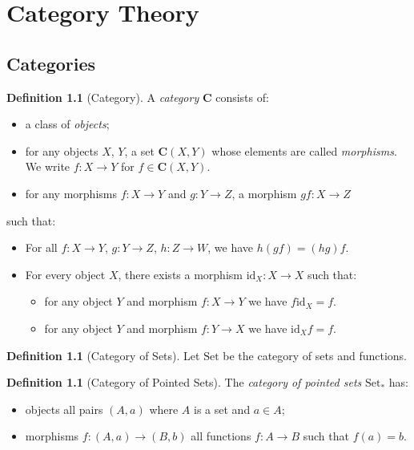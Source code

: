\documentclass{book}
\theoremstyle{definition}
\newtheorem{df}[ax]{Definition}
\newcommand{\id}[1]{\ensuremath{\mathrm{id}_{#1}}}
\begin{document}
\chapter{Category Theory}

\section{Categories}

\begin{df}[Category]
A \emph{category} $\mathbf{C}$ consists of:
\begin{itemize}
\item a class of \emph{objects};
\item for any objects $X$, $Y$, a set $\mathbf{C}(X,Y)$ whose elements are called \emph{morphisms}. We write $f : X \rightarrow Y$ for $f \in \mathbf{C}(X,Y)$.
\item for any morphisms $f : X \rightarrow Y$ and $g : Y \rightarrow Z$, a morphism $gf : X \rightarrow Z$
\end{itemize}
such that:
\begin{itemize}
\item For all $f : X \rightarrow Y$, $g : Y \rightarrow Z$, $h : Z \rightarrow W$, we have $h(gf) = (hg)f$.
\item For every object $X$, there exists a morphism $\id{X} : X \rightarrow X$ such that:
\begin{itemize}
\item for any object $Y$ and morphism $f : X \rightarrow Y$ we have $f \id{X} = f$.
\item for any object $Y$ and morphism $f : Y \rightarrow X$ we have $\id{X} f = f$.
\end{itemize}
\end{itemize}
\end{df}

\begin{df}[Category of Sets]
Let $\mathrm{Set}$ be the category of sets and functions.
\end{df}

\begin{df}[Category of Pointed Sets]
The \emph{category of pointed sets} $\mathrm{Set}_*$ has:
\begin{itemize}
\item objects all pairs $(A,a)$ where $A$ is a set and $a \in A$;
\item morphisms $f : (A,a) \rightarrow (B,b)$ all functions $f : A \rightarrow B$ such that $f(a) = b$.
\end{itemize}
\end{df}
\end{document}
